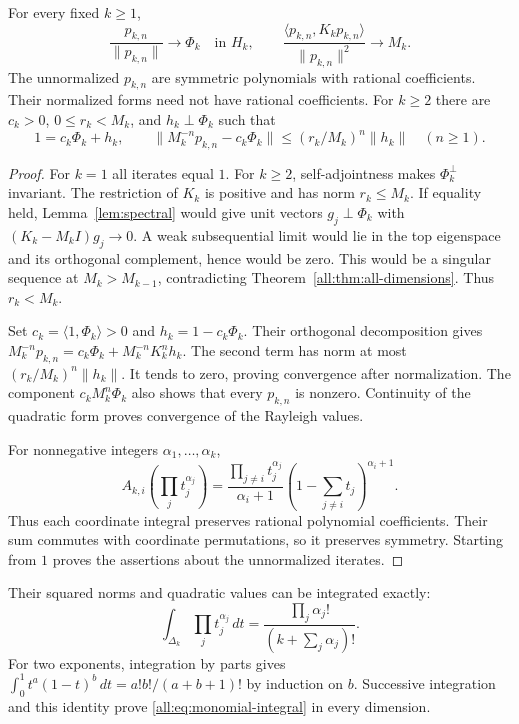 \documentclass[11pt]{article}
\begin{document}
\begin{theorem}\label{all:thm:iteration}
For every fixed $k\geq1$,
\[
 \frac{p_{k,n}}{\|p_{k,n}\|}\longrightarrow\Phi_k
                 \quad\text{in }H_k,
 \qquad
 \frac{\langle p_{k,n},K_kp_{k,n}\rangle}{\|p_{k,n}\|^2}
                  \longrightarrow M_k.
\]
The unnormalized $p_{k,n}$ are symmetric polynomials with rational
coefficients.  Their normalized forms need not have rational coefficients.
For $k\geq2$ there are $c_k>0$, $0\leq r_k<M_k$, and $h_k\perp\Phi_k$
such that
\begin{equation}\label{all:eq:iteration-error}
 1=c_k\Phi_k+h_k,\qquad
 \|M_k^{-n}p_{k,n}-c_k\Phi_k\|
            \leq(r_k/M_k)^n\|h_k\|\quad(n\geq1).
\end{equation}
\end{theorem}

\begin{proof}
For $k=1$ all iterates equal $1$.
For $k\geq2$, self-adjointness makes $\Phi_k^\perp$ invariant.
The restriction of $K_k$ is positive and has norm $r_k\leq M_k$.
If equality held, Lemma~\ref{lem:spectral} would give unit vectors
$g_j\perp\Phi_k$ with $(K_k-M_kI)g_j\to0$.
A weak subsequential limit would lie in the top eigenspace and its
orthogonal complement, hence would be zero.
This would be a singular sequence at $M_k>M_{k-1}$, contradicting
Theorem~\ref{all:thm:all-dimensions}.  Thus $r_k<M_k$.

Set $c_k=\langle1,\Phi_k\rangle>0$ and $h_k=1-c_k\Phi_k$.
Their orthogonal decomposition gives
$M_k^{-n}p_{k,n}=c_k\Phi_k+M_k^{-n}K_k^nh_k$.
The second term has norm at most $(r_k/M_k)^n\|h_k\|$.
It tends to zero, proving convergence after normalization.
The component $c_kM_k^n\Phi_k$ also shows that every $p_{k,n}$ is nonzero.
Continuity of the quadratic form proves convergence of the Rayleigh values.

For nonnegative integers $\alpha_1,\ldots,\alpha_k$,
\begin{equation}\label{all:eq:monomial-action}
 A_{k,i}\left(\prod_jt_j^{\alpha_j}\right)
 =\frac{\prod_{j\ne i}t_j^{\alpha_j}}{\alpha_i+1}
                  \left(1-\sum_{j\ne i}t_j\right)^{\alpha_i+1}.
\end{equation}
Thus each coordinate integral preserves rational polynomial coefficients.
Their sum commutes with coordinate permutations, so it preserves symmetry.
Starting from $1$ proves the assertions about the unnormalized iterates.
\end{proof}

Their squared norms and quadratic values can be integrated exactly:
\begin{equation}\label{all:eq:monomial-integral}
 \int_{\Delta_k}\prod_jt_j^{\alpha_j}\,dt
      =\frac{\prod_j\alpha_j!}{(k+\sum_j\alpha_j)!}.
\end{equation}
For two exponents, integration by parts gives
$\int_0^1t^a(1-t)^b\,dt=a!b!/(a+b+1)!$ by induction on $b$.
Successive integration and this identity prove
\eqref{all:eq:monomial-integral} in every dimension.
\end{document}

